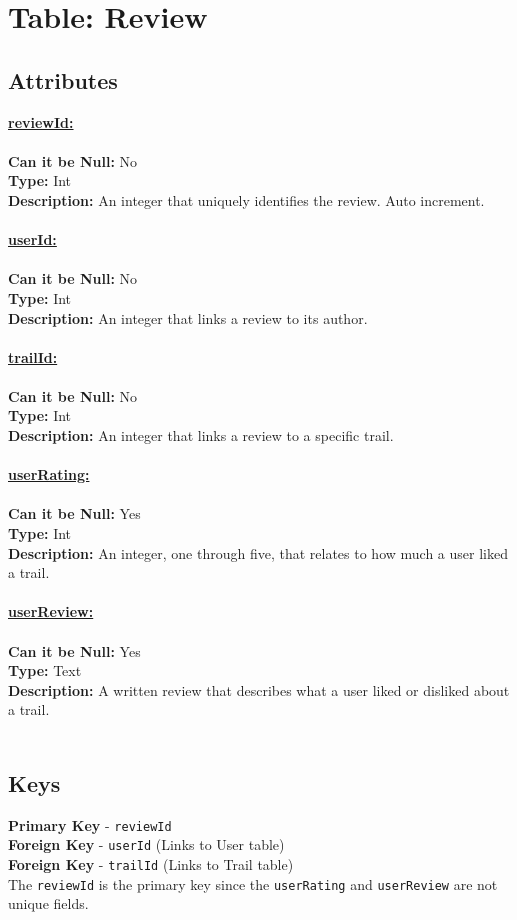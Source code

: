 \newpage
\section{Table: Review}
\subsection{Attributes}
\textbf{\underline{reviewId:}}\\
\\
\textbf{Can it be Null:} No\\
\textbf{Type:} Int \\
\textbf{Description:} An integer that uniquely identifies the review. Auto increment.\\\\
\textbf{\underline{userId:}}\\
\\
\textbf{Can it be Null:} No\\
\textbf{Type:} Int\\
\textbf{Description:} An integer that links a review to its author.\\\\
\textbf{\underline{trailId:}}\\
\\
\textbf{Can it be Null:} No\\
\textbf{Type:} Int\\
\textbf{Description:} An integer that links a review to a specific trail.\\\\
\textbf{\underline{userRating:}}\\
\\
\textbf{Can it be Null:} Yes\\
\textbf{Type:} Int\\
\textbf{Description:} An integer, one through five, that relates to how 
much a user liked a trail. \\\\
\textbf{\underline{userReview:}}\\
\\
\textbf{Can it be Null:} Yes\\
\textbf{Type:} Text\\
\textbf{Description:} A written review that describes what a user 
liked or disliked about a trail.\\\\
\subsection{Keys}
\textbf{Primary Key} - \texttt{reviewId}\\
\textbf{Foreign Key} - \texttt{userId} (Links to User table)\\
\textbf{Foreign Key} - \texttt{trailId} (Links to Trail table)\\
The \texttt{reviewId} is the primary key since the \texttt{userRating} and \texttt{userReview} are not unique fields.

